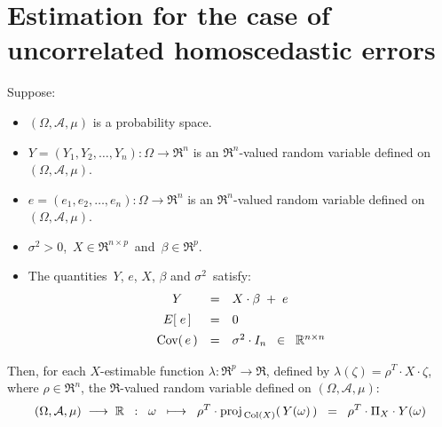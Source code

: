 

\section{Estimation for the case of uncorrelated homoscedastic errors}
\setcounter{theorem}{0}
\setcounter{equation}{0}

\renewcommand{\theenumi}{\roman{enumi}}
\renewcommand{\labelenumi}{\textnormal{(\theenumi)}$\;\;$}


\begin{theorem}
\mbox{}
\vskip 0.1cm
\noindent
Suppose:
\begin{itemize}
\item
	$(\Omega,\mathcal{A},\mu)$ is a probability space.
\item
	$Y = (Y_{1}, Y_{2}, \ldots, Y_{n}) : \Omega \longrightarrow \Re^{n}$ is an $\Re^{n}$-valued random variable
	defined on $(\Omega,\mathcal{A},\mu)$.
\item
	$e = (e_{1}, e_{2}, \ldots, e_{n}) : \Omega \longrightarrow \Re^{n}$ is an $\Re^{n}$-valued random variable
	defined on $(\Omega,\mathcal{A},\mu)$.
\item
	$\sigma^{2} > 0$,\, $X \in \Re^{n \times p}$\, and \,$\beta \in \Re^{p}$.
\item
	The quantities \,$Y$, $e$, $X$, $\beta$ and $\sigma^{2}$\, satisfy:
	\begin{equation*}
	\begin{array}{ccl}
	Y & = & X \cdot \beta \; + \; e
	\\
	E\!\left[\;e\,\right] &  \overset{{\color{white}\vert}}{=} & 0
	\\
	\Cov\!\left(\,e\,\right) & \overset{{\color{white}\vert}}{=} & \sigma^{2} \cdot I_{n} \;\; \in \;\; \Re^{n \times n}
	\end{array}
	\end{equation*}
\end{itemize}
Then,
for each $X$-estimable function $\lambda : \Re^{p} \longrightarrow \Re$,
defined by $\lambda(\zeta) = \rho^{T} \cdot X \cdot \zeta$, where $\rho \in \Re^{n}$,
the $\Re$-valued random variable defined on $(\Omega,\mathcal{A},\mu)$:
\begin{equation*}
(\Omega,\mathcal{A},\mu) \;\longrightarrow\; \Re
\;\; : \;\;
\omega
\;\;\longmapsto\;\;
\rho^{T} \cdot \proj_{\,\Col(X)}\!\left(\,Y(\omega)\,\right)
\;\;=\;\;
\rho^{T} \cdot \Pi_{X} \cdot Y(\omega)

\end{equation*}
\end{theorem}
